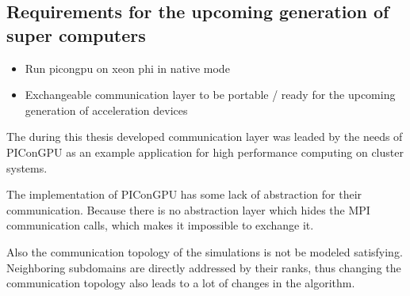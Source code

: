 \subsection{Requirements for the upcoming generation of super computers}
\begin{itemize}
\item Run picongpu on xeon phi in native mode
\item Exchangeable communication layer to be portable / ready for the
  upcoming generation of acceleration devices
\end{itemize}


The during this thesis developed communication layer was leaded by the
needs of PIConGPU as an example application for high performance
computing on cluster systems.

The implementation of PIConGPU has some lack of abstraction for their
communication. Because there is no abstraction layer which hides the
MPI communication calls, which makes it impossible to exchange it.

Also the communication topology of the simulations is not be modeled
satisfying. Neighboring subdomains are directly addressed by their
ranks, thus changing the communication topology also leads to a lot of
changes in the algorithm.



\cleardoublepage

